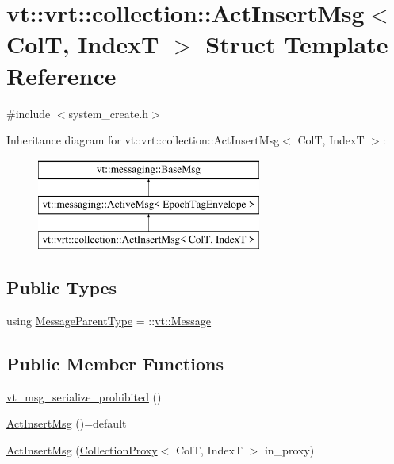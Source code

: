 \hypertarget{structvt_1_1vrt_1_1collection_1_1_act_insert_msg}{}\section{vt\+:\+:vrt\+:\+:collection\+:\+:Act\+Insert\+Msg$<$ ColT, IndexT $>$ Struct Template Reference}
\label{structvt_1_1vrt_1_1collection_1_1_act_insert_msg}


{\ttfamily \#include $<$system\+\_\+create.\+h$>$}

Inheritance diagram for vt\+:\+:vrt\+:\+:collection\+:\+:Act\+Insert\+Msg$<$ ColT, IndexT $>$\+:\begin{figure}[H]
\begin{center}
\leavevmode
\includegraphics[height=3.000000cm]{structvt_1_1vrt_1_1collection_1_1_act_insert_msg}
\end{center}
\end{figure}
\subsection*{Public Types}
\begin{DoxyCompactItemize}
\item 
using \hyperlink{structvt_1_1vrt_1_1collection_1_1_act_insert_msg_a85df5f61a78f6a48ed7488d6e497f1f3}{Message\+Parent\+Type} = \+::\hyperlink{namespacevt_a3a3ddfef40b4c90915fa43cdd5f129ea}{vt\+::\+Message}
\end{DoxyCompactItemize}
\subsection*{Public Member Functions}
\begin{DoxyCompactItemize}
\item 
\hyperlink{structvt_1_1vrt_1_1collection_1_1_act_insert_msg_afd6395c664e7eac82e17834ed7af9ce7}{vt\+\_\+msg\+\_\+serialize\+\_\+prohibited} ()
\item 
\hyperlink{structvt_1_1vrt_1_1collection_1_1_act_insert_msg_acd0c4f8868194e27580d9bf5d748bb14}{Act\+Insert\+Msg} ()=default
\item 
\hyperlink{structvt_1_1vrt_1_1collection_1_1_act_insert_msg_a26f5c8527a3fd30ece4ef661ebb41798}{Act\+Insert\+Msg} (\hyperlink{structvt_1_1vrt_1_1collection_1_1_collection_proxy}{Collection\+Proxy}$<$ ColT, IndexT $>$ in\+\_\+proxy)
\end{DoxyCompactItemize}
